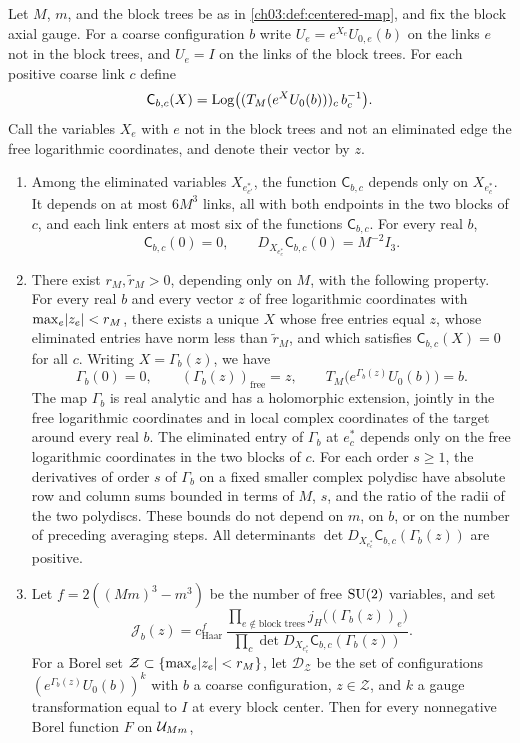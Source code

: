 \begin{lemma}\label{ch03:lem:relative-coarea}
Let $M$, $m$, and the block trees be as in \cref{ch03:def:centered-map}, and fix the block axial gauge. For a coarse configuration $b$ write $U_e=e^{X_e}U_{0,e}(b)$ on the links $e$ not in the block trees, and $U_e=I$ on the links of the block trees. For each positive coarse link $c$ define
\[
 \mathsf C_{b,c}(X)=\operatorname{Log}\bigl((T_M(e^XU_0(b)))_c\,b_c^{-1}\bigr).
\]
Call the variables $X_e$ with $e$ not in the block trees and not an eliminated edge the free logarithmic coordinates, and denote their vector by $z$.
\begin{enumerate}
\item Among the eliminated variables $X_{e^*_{c'}}$, the function $\mathsf C_{b,c}$ depends only on $X_{e^*_c}$. It depends on at most $6M^3$ links, all with both endpoints in the two blocks of $c$, and each link enters at most six of the functions $\mathsf C_{b,c}$. For every real $b$,
\[
 \mathsf C_{b,c}(0)=0,\qquad D_{X_{e^*_c}}\mathsf C_{b,c}(0)=M^{-2}I_3.
\]
\item There exist $r_M,\widetilde r_M>0$, depending only on $M$, with the following property. For every real $b$ and every vector $z$ of free logarithmic coordinates with $\max_e\lvert z_e\rvert<r_M$, there exists a unique $X$ whose free entries equal $z$, whose eliminated entries have norm less than $\widetilde r_M$, and which satisfies $\mathsf C_{b,c}(X)=0$ for all $c$. Writing $X=\Gamma_b(z)$, we have
\[
 \Gamma_b(0)=0,\qquad (\Gamma_b(z))_{\mathrm{free}}=z,\qquad T_M\bigl(e^{\Gamma_b(z)}U_0(b)\bigr)=b.
\]
The map $\Gamma_b$ is real analytic and has a holomorphic extension, jointly in the free logarithmic coordinates and in local complex coordinates of the target around every real $b$. The eliminated entry of $\Gamma_b$ at $e^*_c$ depends only on the free logarithmic coordinates in the two blocks of $c$. For each order $s\ge1$, the derivatives of order $s$ of $\Gamma_b$ on a fixed smaller complex polydisc have absolute row and column sums bounded in terms of $M$, $s$, and the ratio of the radii of the two polydiscs. These bounds do not depend on $m$, on $b$, or on the number of preceding averaging steps. All determinants $\det D_{X_{e^*_c}}\mathsf C_{b,c}(\Gamma_b(z))$ are positive.
\item Let $f=2((Mm)^3-m^3)$ be the number of free $\mathrm{SU}(2)$ variables, and set
\[
 \mathscr J_b(z)=c_{\mathrm{Haar}}^f\,
 \frac{\prod_{e\notin\text{block trees}}j_H\bigl((\Gamma_b(z))_e\bigr)}{\prod_c\det D_{X_{e^*_c}}\mathsf C_{b,c}(\Gamma_b(z))}.
\]
For a Borel set $\mathcal Z\subset\{\max_e\lvert z_e\rvert<r_M\}$, let $\mathcal D_{\mathcal Z}$ be the set of configurations $(e^{\Gamma_b(z)}U_0(b))^k$ with $b$ a coarse configuration, $z\in\mathcal Z$, and $k$ a gauge transformation equal to $I$ at every block center. Then for every nonnegative Borel function $F$ on $\mathcal U_{Mm}$,

\end{enumerate}
\end{lemma}
